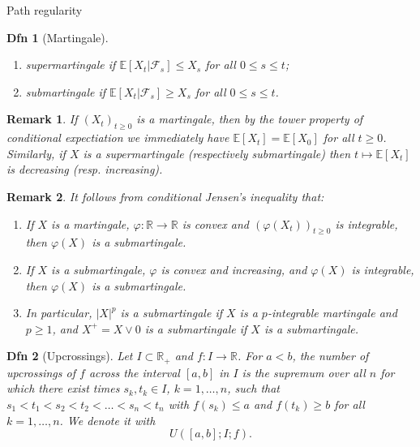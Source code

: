 \documentclass[a4paper]{article}
\theoremstyle{mytheoremstyle}
\newtheorem{definition}{Dfn}
\newtheorem*{remark}{Remark}
\newcommand{\1}{\mathds{1}}
\begin{document}
\begin{multicols*}{3}
\begin{roundbox}{Path regularity}
\begin{definition}[Martingale]
\begin{enumerate}[parsep=0.2em]
    \item {\emph{supermartingale}} if $\mathbb{E} [X_t |\mathcal{F}_s]
    \leqslant X_s$ for all $0 \leqslant s \leqslant t$;
    
    \item {\emph{submartingale}} if $\mathbb{E} [X_t |\mathcal{F}_s] \geqslant
    X_s$ for all $0 \leqslant s \leqslant t$.
  \end{enumerate}
\end{definition}

\begin{remark}
  \label{rem:martingale_monotone_mean}If $(X_t)_{t \geqslant 0}$ is a
  martingale, then by the tower property of conditional expectiation we
  immediately have $\mathbb{E} [X_t] =\mathbb{E} [X_0]$ for all $t \geqslant
  0$. Similarly, if $X$ is a supermartingale (respectively submartingale) then
  $t \mapsto \mathbb{E} [X_t]$ is decreasing (resp. increasing).
\end{remark}
\end{roundbox}

\begin{unlabeledbox}
\begin{remark}
  \label{rem:martingale.jensen}It follows from conditional Jensen's inequality
  that:
  \begin{enumerate}[parsep=0.2em]
    \item If $X$ is a martingale, $\varphi : \mathbb{R} \rightarrow
    \mathbb{R}$ is convex and $(\varphi (X_t))_{t \geqslant 0}$ is integrable,
    then $\varphi (X)$ is a submartingale.
    
    \item If $X$ is a submartingale, $\varphi$ is convex and increasing, and
    $\varphi (X)$ is integrable, then $\varphi (X)$ is a submartingale.
    
    \item In particular, $|X|^p$ is a submartingale if $X$ is a $p$-integrable
    martingale and $p \geqslant 1$, and $X^+ = X \vee 0$ is a submartingale if
    $X$ is a submartingale.
  \end{enumerate}
\end{remark}

\begin{definition}[Upcrossings]
  \label{def:upcrossings}Let $I \subset \mathbb{R}_+$ and $f : I \rightarrow
  \mathbb{R}$. For $a < b$, the number of upcrossings of $f$ across the
  interval $[a, b]$ in $I$ is the supremum over all $n$ for which there exist
  times $s_k, t_k \in I$, $k = 1, \ldots, n$, such that $s_1 < t_1 < s_2 < t_2
  < \ldots < s_n < t_n$ with $f (s_k) \leqslant a$ and $f (t_k) \geqslant b$
  for all $k = 1, \ldots, n$. We denote it with
  \[ U ([a, b] ; I ; f) . \]
\end{definition}


\end{unlabeledbox}
\end{multicols*}
\end{document}
